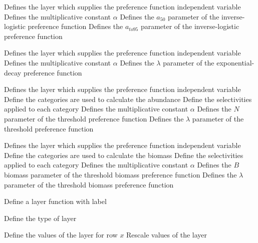  {Defines the layer which supplies the preference function independent variable}
 {Defines the multiplicative constant $\alpha$}
 {Defines the $a_{50}$ parameter of the inverse-logistic preference function}
 {Defines the $a_{to95}$ parameter of the inverse-logistic preference function}
\par\textbf{}\par
{} {Defines the layer which supplies the preference function independent variable}
 {Defines the multiplicative constant $\alpha$}
 {Defines the $\lambda$ parameter of the exponential-decay preference function}
\par\textbf{}\par
{} {Defines the layer which supplies the preference function independent variable}
 {Define the categories are used to calculate the abundance}
 {Define the selectivities applied to each category}
 {Defines the multiplicative constant $\alpha$}
 {Defines the $N$ parameter of the threshold preference function}
 {Defines the $\lambda$ parameter of the threshold preference function}
\par\textbf{}\par
{} {Defines the layer which supplies the preference function independent variable}
 {Define the categories are used to calculate the biomass}
 {Define the selectivities applied to each category}
 {Defines the multiplicative constant $\alpha$}
 {Defines the $B$ biomass parameter of the threshold biomass preference function}
 {Defines the $\lambda$ parameter of the threshold biomass preference function}
\par {} {Define a layer function with label}\par
{} {Define the type of layer}
\par\textbf{}\par
{} {Define the values of the layer for row $x$}
 {Rescale values of the layer}
\par\textbf{}\par
